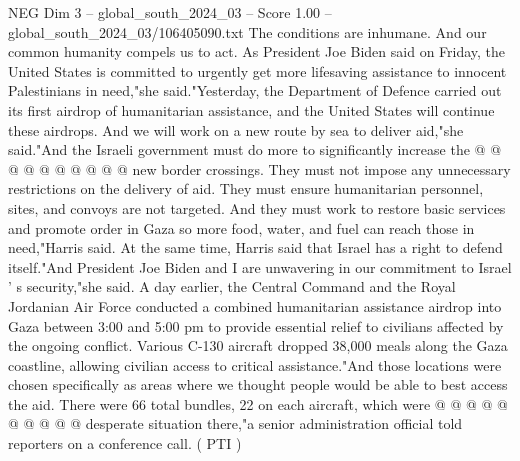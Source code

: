 \begin{textsample}{NEG Dim 3 – global\_south\_2024\_03 – Score 1.00 – global\_south\_2024\_03/106405090.txt}
The conditions are inhumane.
And our common humanity compels us to act.
As President Joe Biden said on Friday, the United States is committed to urgently get more lifesaving assistance to innocent Palestinians in need,"she said."Yesterday, the Department of Defence carried out its first airdrop of humanitarian assistance, and the United States will continue these airdrops.
And we will work on a new route by sea to deliver aid,"she said."And the Israeli government must do more to significantly increase the @ @ @ @ @ @ @ @ @ @ new border crossings.
They must not impose any unnecessary restrictions on the delivery of aid.
They must ensure humanitarian personnel, sites, and convoys are not targeted.
And they must work to restore basic services and promote order in Gaza so more food, water, and fuel can reach those in need,"Harris said.
At the same time, Harris said that Israel has a right to defend itself."And President Joe Biden and I are unwavering in our commitment to Israel ' s security,"she said.
A day earlier, the Central Command and the Royal Jordanian Air Force conducted a combined humanitarian assistance airdrop into Gaza between 3:00 and 5:00 pm to provide essential relief to civilians affected by the ongoing conflict.
Various C-130 aircraft dropped 38,000 meals along the Gaza coastline, allowing civilian access to critical assistance."And those locations were chosen specifically as areas where we thought people would be able to best access the aid.
There were 66 total bundles, 22 on each aircraft, which were @ @ @ @ @ @ @ @ @ @ desperate situation there,"a senior administration official told reporters on a conference call. ( PTI )

\end{textsample}
